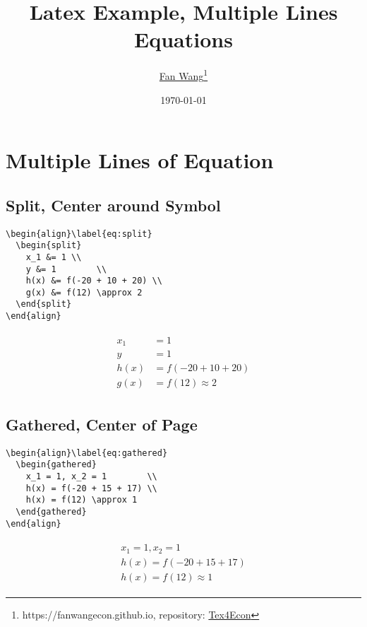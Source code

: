 \documentclass[12pt,english]{article}
\title{Latex Example, Multiple Lines Equations}
\author{\href{https://fanwangecon.github.io/}{Fan Wang}\thanks{https://fanwangecon.github.io, repository: \href{https://fanwangecon.github.io/Tex4Econ/}{Tex4Econ}}}
\date{\today}
\begin{document}
\maketitle


\section{Multiple Lines of Equation}

\subsection{Split, Center around Symbol}
\begin{verbatim}
\begin{align}\label{eq:split}
  \begin{split}
    x_1 &= 1 \\
    y &= 1        \\
    h(x) &= f(-20 + 10 + 20) \\
    g(x) &= f(12) \approx 2
  \end{split}
\end{align}
\end{verbatim}

\begin{align}\label{eq:split}
  \begin{split}
    x_1 &= 1 \\
    y &= 1        \\
    h(x) &= f(-20 + 10 + 20) \\
    g(x) &= f(12) \approx 2
  \end{split}
\end{align}

\pagebreak

\subsection{Gathered, Center of Page}
\begin{verbatim}
\begin{align}\label{eq:gathered}
  \begin{gathered}
    x_1 = 1, x_2 = 1        \\
    h(x) = f(-20 + 15 + 17) \\
    h(x) = f(12) \approx 1
  \end{gathered}
\end{align}
\end{verbatim}

\begin{align}\label{eq:gathered}
  \begin{gathered}
    x_1 = 1, x_2 = 1        \\
    h(x) = f(-20 + 15 + 17) \\
    h(x) = f(12) \approx 1
  \end{gathered}
\end{align}
\end{document}
